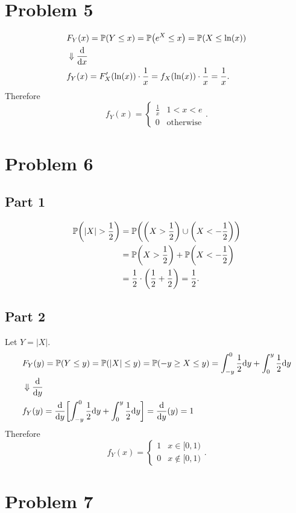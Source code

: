 \documentclass[12pt]{extarticle}
\begin{document}
\section*{Problem 5}
\begin{align*}
	& F_Y (x) = \mathbb{P}\qty(Y \leq x) = \mathbb{P}\qty(e^X \leq x) = \mathbb{P}\qty(X \leq \ln(x)) \\
	& \Downarrow \dv{x} \\
	& f_Y (x) = F_X'(\ln(x)) \cdot \frac{1}{x} = f_X (\ln(x)) \cdot \frac{1}{x} = \frac{1}{x}
.\end{align*}
Therefore
\[
	f_Y(x) = 
	\begin{cases}
		\frac{1}{x} & 1 < x < e \\
		0 & \text{otherwise}
	\end{cases}
.\]

\section*{Problem 6}
\subsection*{Part 1}
\begin{align*}
	\mathbb{P}\qty(|X| > \frac{1}{2}) &= \mathbb{P}\qty(\qty(X > \frac{1}{2}) \cup \qty(X < -\frac{1}{2})) \\
							 &= \mathbb{P}\qty(X > \frac{1}{2}) + \mathbb{P}\qty(X < -\frac{1}{2}) \\
							 &= \frac{1}{2}\cdot\qty(\frac{1}{2} + \frac{1}{2}) = \frac{1}{2}
.\end{align*}


\subsection*{Part 2}
Let $Y = |X|$.
\begin{align*}
	& F_Y (y) = \mathbb{P}\qty(Y \leq y) = \mathbb{P}\qty(|X| \leq y) = \mathbb{P}\qty(-y \geq X \leq y) = \int_{-y}^0 \frac{1}{2} \dd y + \int_0^y \frac{1}{2} \dd y \\
	& \Downarrow \dv{y} \\
	& f_Y (y) = \dv{y} \qty[\int_{-y}^0 \frac{1}{2} \dd y + \int_0^y \frac{1}{2} \dd y] = \dv{y} (y) = 1
\end{align*}
Therefore
\[
	f_Y (x) =
	\begin{cases}
		1 & x \in [0,1) \\
		0 & x \notin [0,1)
	\end{cases}
.\]

\section*{Problem 7}
\end{document}

